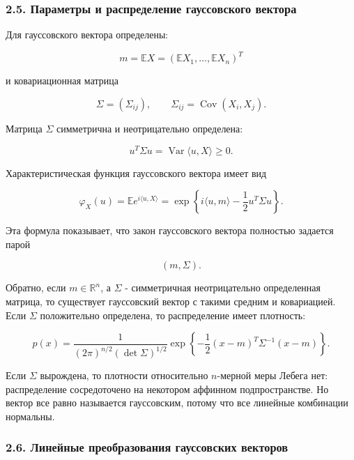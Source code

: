 \documentclass[
  11pt,
  a4paper,
]{article}
\begin{document}
\subsubsection{2.5. Параметры и распределение гауссовского
вектора}\label{ux43fux430ux440ux430ux43cux435ux442ux440ux44b-ux438-ux440ux430ux441ux43fux440ux435ux434ux435ux43bux435ux43dux438ux435-ux433ux430ux443ux441ux441ux43eux432ux441ux43aux43eux433ux43e-ux432ux435ux43aux442ux43eux440ux430}

Для гауссовского вектора определены:

\[
m=\mathbb EX
=
(\mathbb EX_1,\ldots,\mathbb EX_n)^T
\]

и ковариационная матрица

\[
\Sigma=(\Sigma_{ij}),
\qquad
\Sigma_{ij}
=
\operatorname{Cov}(X_i,X_j).
\]

Матрица \(\Sigma\) симметрична и неотрицательно определена:

\[
u^T\Sigma u
=
\operatorname{Var}\langle u,X\rangle
\ge0.
\]

Характеристическая функция гауссовского вектора имеет вид

\[
\varphi_X(u)
=
\mathbb E e^{i\langle u,X\rangle}
=
\exp\left\{
i\langle u,m\rangle
-\frac12u^T\Sigma u
\right\}.
\]

Эта формула показывает, что закон гауссовского вектора полностью
задается парой

\[
(m,\Sigma).
\]

Обратно, если \(m\in\mathbb R^n\), а \(\Sigma\) - симметричная
неотрицательно определенная матрица, то существует гауссовский вектор с
такими средним и ковариацией. Если \(\Sigma\) положительно определена,
то распределение имеет плотность:

\[
p(x)
=
\frac1{(2\pi)^{n/2}(\det\Sigma)^{1/2}}
\exp\left\{
-\frac12(x-m)^T\Sigma^{-1}(x-m)
\right\}.
\]

Если \(\Sigma\) вырождена, то плотности относительно \(n\)-мерной меры
Лебега нет: распределение сосредоточено на некотором аффинном
подпространстве. Но вектор все равно называется гауссовским, потому что
все линейные комбинации нормальны.

\subsubsection{2.6. Линейные преобразования гауссовских
векторов}\label{ux43bux438ux43dux435ux439ux43dux44bux435-ux43fux440ux435ux43eux431ux440ux430ux437ux43eux432ux430ux43dux438ux44f-ux433ux430ux443ux441ux441ux43eux432ux441ux43aux438ux445-ux432ux435ux43aux442ux43eux440ux43eux432}
\end{document}
